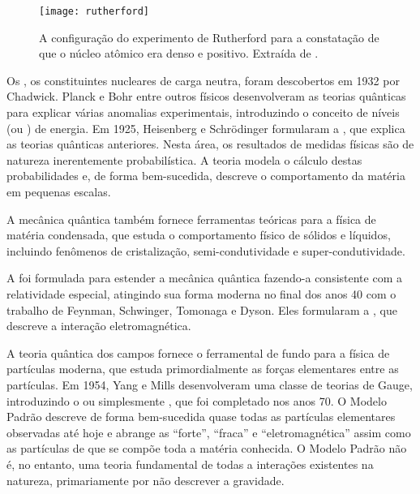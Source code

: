 \begin{figure}
\begin{center}
\texttt{[image: rutherford]}
\end{center}
\caption[O  de Rutherford.]{A configuração do experimento de
Rutherford para a constatação de que o núcleo atômico era denso e
positivo. Extraída de \cite{partadv}.}
\label{fig:rutherford}
\end{figure}

Os , os constituintes nucleares de carga neutra, foram
descobertos em 1932 por Chadwick. Planck e Bohr entre outros físicos
desenvolveram as teorias quânticas para explicar várias anomalias
experimentais, introduzindo o conceito de níveis (ou ) de
energia. Em 1925, Heisenberg e Schrödinger formularam a , que explica as teorias quânticas anteriores. Nesta área, os
resultados de medidas físicas são de natureza inerentemente probabilística. A
teoria modela o cálculo destas probabilidades e, de forma bem-sucedida,
descreve o comportamento da matéria em pequenas escalas.

A mecânica quântica tam\-bém fornece ferramentas te\-ó\-ri\-cas para a
fí\-si\-ca de ma\-té\-ria condensada, que estuda o comportamento físico de
sólidos e líquidos, incluindo fenômenos de cristalização, semi-condutividade e
super-condutividade.

A  foi formulada para estender a mecânica
quântica fazendo-a consistente com a relatividade especial, atingindo sua
forma moderna no final dos anos 40 com o trabalho de Feynman, Schwinger,
Tomonaga e Dyson. Eles formularam a , que
descreve a interação eletromagnética.

A teoria quântica dos campos fornece o ferramental de fundo para a fí\-si\-ca
de par\-tí\-cu\-las moderna, que estuda primordialmente as forças elementares
entre as partículas. Em 1954, Yang e Mills desenvolveram uma classe de teorias
de Gauge, introduzindo o  ou simplesmente
, que foi completado nos anos 70. O Modelo Padrão descreve
de forma bem-sucedida quase todas as partículas elementares observadas até
hoje e abrange as  ``forte'', ``fraca'' e
``eletromagnética'' assim como as partículas de que se compõe toda a matéria
conhecida. O Modelo Padrão não é, no entanto, uma teoria fundamental de todas
a interações existentes na natureza, primariamente por não descrever a
gravidade.

